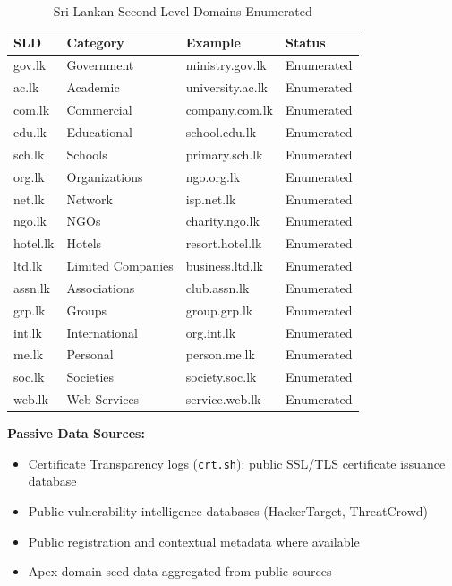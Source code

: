 \documentclass[preprint,review,12pt]{elsarticle}
\begin{document}
\begin{table}[H]
\centering
\caption{Sri Lankan Second-Level Domains Enumerated}
\label{tab:tlds}
\begin{tabular}{|l|l|l|l|}
\hline
SLD & Category & Example & Status \\
\hline
gov.lk & Government & ministry.gov.lk & Enumerated \\
\hline
ac.lk & Academic & university.ac.lk & Enumerated \\
\hline
com.lk & Commercial & company.com.lk & Enumerated \\
\hline
edu.lk & Educational & school.edu.lk & Enumerated \\
\hline
sch.lk & Schools & primary.sch.lk & Enumerated \\
\hline
org.lk & Organizations & ngo.org.lk & Enumerated \\
\hline
net.lk & Network & isp.net.lk & Enumerated \\
\hline
ngo.lk & NGOs & charity.ngo.lk & Enumerated \\
\hline
hotel.lk & Hotels & resort.hotel.lk & Enumerated \\
\hline
ltd.lk & Limited Companies & business.ltd.lk & Enumerated \\
\hline
assn.lk & Associations & club.assn.lk & Enumerated \\
\hline
grp.lk & Groups & group.grp.lk & Enumerated \\
\hline
int.lk & International & org.int.lk & Enumerated \\
\hline
me.lk & Personal & person.me.lk & Enumerated \\
\hline
soc.lk & Societies & society.soc.lk & Enumerated \\
\hline
web.lk & Web Services & service.web.lk & Enumerated \\
\hline
\end{tabular}
\end{table}

\textbf{Passive Data Sources:}
\begin{itemize}
    \item Certificate Transparency logs (\texttt{crt.sh}): public SSL/TLS certificate issuance database
    \item Public vulnerability intelligence databases (HackerTarget, ThreatCrowd)
    \item Public registration and contextual metadata where available
    \item Apex-domain seed data aggregated from public sources
\end{itemize}
\end{document}

